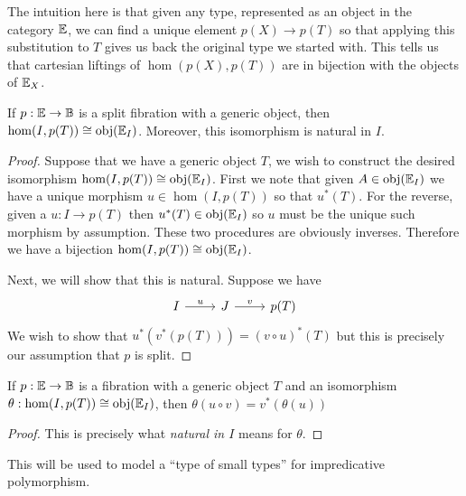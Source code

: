 The intuition here is that given any type, represented as an object in
the category $\mathbb{E}$, we can find a unique element $p(X) \to p(T)$ so
that applying this substitution to $T$ gives us back the original type
we started with. This tells us that cartesian liftings of
$\hom(p(X), p(T))$ are in bijection with the objects of
$\mathbb{E}_X$.
\begin{lem}\label{lem:fibrations:genericobject}
  If $p : \mathbb{E} \to \mathbb{B}$ is a split fibration with a generic object,
  then $\hom(I, p(T)) \cong \operatorname{obj}(\mathbb{E}_I)$. Moreover, this isomorphism
  is natural in $I$.
\end{lem}
\begin{proof}
  Suppose that we have a generic object $T$, we wish to construct the
  desired isomorphism $\hom(I, p(T)) \cong \operatorname{obj}(\mathbb{E}_I)$. First we
  note that given $A \in \operatorname{obj}(\mathbb{E}_I)$ we have a unique morphism
  $u \in \hom(I, p(T))$ so that $u^*(T)$. For the reverse, given a
  $u : I \to p(T)$ then $u^*(T) \in \operatorname{obj}(\mathbb{E}_I)$ so $u$ must be the
  unique such morphism by assumption. These two procedures are
  obviously inverses. Therefore we have a bijection
  $\hom(I, p(T)) \cong \operatorname{obj}(\mathbb{E}_I)$.

  Next, we will show that this is natural. Suppose we have
  \[
    \begin{tikzcd}
      I \ar[r, "u"] & J \ar[r, "v"] & p(T)
    \end{tikzcd}
  \]
  We wish to show that $u^*(v^*(p(T))) = (v \circ u)^*(T)$ but this is
  precisely our assumption that $p$ is split.
\end{proof}
\begin{cor}\label{cor:fibrations:reindexingcommutes}
  If $p : \mathbb{E} \to \mathbb{B}$ is a fibration with a generic object $T$
  and an isomorphism $\theta : \hom(I, p(T)) \cong \operatorname{obj}(\mathbb{E}_I)$,
  then $\theta(u \circ v) = v^*(\theta(u))$
\end{cor}
\begin{proof}
  This is precisely what \emph{natural in $I$} means for $\theta$.
\end{proof}
This will be used to model a ``type of small types'' for
impredicative polymorphism.

